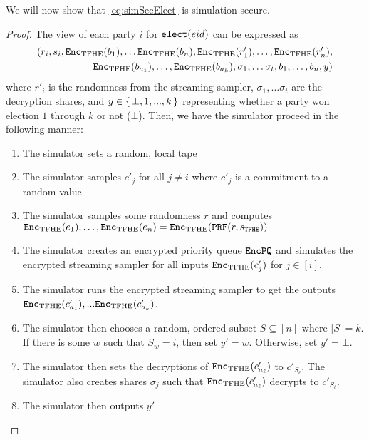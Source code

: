 \begin{lemma}
	We will now show that \cref{eq:simSecElect} is simulation secure.
	\begin{proof}
		The view of each party $i$ for $\texttt{elect}({eid})$ can be expressed as
		\begin{align*}
			(r_i,  s_i, \texttt{Enc}_{\mathrm{TFHE}}(b_{1}), \dots \texttt{Enc}_{\mathrm{TFHE}}(b_n), \texttt{Enc}_{\mathrm{TFHE}}(r'_1), \dots, \texttt{Enc}_{\mathrm{TFHE}}(r'_n), \\
				\texttt{Enc}_{\mathrm{TFHE}}(b_{a_1}), \dots, \texttt{Enc}_{\mathrm{TFHE}}(b_{a_k}), \sigma_1, \dots \sigma_t, b_1, \dots, b_n, y)
		\end{align*}
		where $r'_i$ is the randomness from the streaming sampler, $\sigma_1, \dots \sigma_t$ are the decryption shares,
		and $y \in \set{\bot, 1, ..., k}$ representing whether a party won election $1$ through $k$ or not ($\bot$).
		Then, we have the simulator proceed in the following manner:
		\begin{enumerate}
			\item The simulator sets a random, local tape
			\item The simulator samples $c'_j$ for all $j \neq i$ where $c'_j$ is a commitment to a random value
			\item The simulator samples some randomness $r$ and computes $\texttt{Enc}_{\mathrm{TFHE}}(e_1), \dots, \texttt{Enc}_{\mathrm{TFHE}}(e_n) = \texttt{Enc}_{\mathrm{TFHE}}(\texttt{PRF}(r, s_\texttt{TFHE}))$
			\item The simulator creates an encrypted priority queue $\texttt{EncPQ}$ and simulates the encrypted streaming sampler for all inputs $\texttt{Enc}_{\mathrm{TFHE}}(c'_j)$ for $j \in [i]$.
			\item The simulator runs the encrypted streaming sampler to get the outputs $\texttt{Enc}_{\mathrm{TFHE}}(c'_{a_1}),... \texttt{Enc}_{\mathrm{TFHE}}(c'_{a_k})$.
			\item The simulator then chooses a random, ordered subset $S \subseteq [n]$ where $|S| = k$. 
			If there is some $w$ such that $S_w = i$, then set $y' = w$. Otherwise, set $y' = \bot$.
			\item The simulator then sets the decryptions of $\texttt{Enc}_{\mathrm{TFHE}}(c'_{a_\ell})$ to $c'_{S_\ell}$.
			The simulator also creates shares $\sigma_j$ such that $\texttt{Enc}_{\mathrm{TFHE}}(c'_{a_\ell})$ decrypts to $c'_{S_\ell}$.
			\item The simulator then outputs $y'$
			

\end{enumerate}
\end{proof}
\end{lemma}
